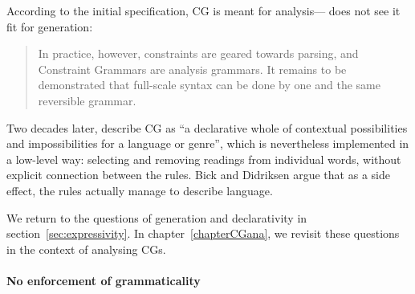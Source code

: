 
According to the initial specification, CG is meant for analysis---\cite{karlsson1995constraint} does not see it fit for generation:

\begin{quote}
In practice, however, constraints are geared towards parsing, and Constraint Grammars are analysis grammars. It remains to be demonstrated that full-scale syntax can be done by one and the same reversible grammar.
\end{quote}
\noindent Two decades later, \cite{bick2015} describe CG as ``a
declarative whole of contextual possibilities and impossibilities for
a language or genre'', which is nevertheless implemented in a
low-level way: selecting and removing readings from individual words,
without explicit connection between the rules. Bick and Didriksen
argue that as a side effect, the rules actually manage to describe language.

We return to the questions of generation and declarativity in section~\ref{sec:expressivity}. 
In chapter~\ref{chapterCGana}, we revisit these questions in the context of analysing CGs.

 
\paragraph{No enforcement of grammaticality} 

